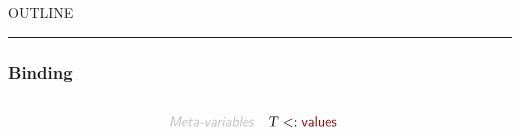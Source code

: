 


    OUTLINE
  \tableofcontents
\renewcommand{\VARHYPER}[3]{\VAR{#3}}
\renewcommand{\NAMEHYPER}[3]{\NAME{#3}}
\renewcommand{\SYNHYPER}[3]{\SYN{#3}}
\renewcommand{\SEMHYPER}[3]{\SEM{#3}}
\renewcommand{\SECTHYPER}[3]{\SECT{#3}}
\begin{center}
\rule{3in}{0.4pt}
\end{center}

\subsubsection{Binding}\hypertarget{binding}{}\label{binding}

\begin{align*}
  [ \
  \KEY{Type} \quad & \NAMEREF{environments} \\
  \KEY{Alias} \quad & \NAMEREF{envs} \\
  \KEY{Datatype} \quad & \NAMEREF{identifiers} \\
  \KEY{Alias} \quad & \NAMEREF{ids} \\
  \KEY{Funcon} \quad & \NAMEREF{identifier-tagged} \\
  \KEY{Alias} \quad & \NAMEREF{id-tagged} \\
  \KEY{Funcon} \quad & \NAMEREF{fresh-identifier} \\
  \KEY{Entity} \quad & \NAMEREF{environment} \\
  \KEY{Alias} \quad & \NAMEREF{env} \\
  \KEY{Funcon} \quad & \NAMEREF{initialise-binding} \\
  \KEY{Funcon} \quad & \NAMEREF{bind-value} \\
  \KEY{Alias} \quad & \NAMEREF{bind} \\
  \KEY{Funcon} \quad & \NAMEREF{unbind} \\
  \KEY{Funcon} \quad & \NAMEREF{bound-directly} \\
  \KEY{Funcon} \quad & \NAMEREF{bound-value} \\
  \KEY{Alias} \quad & \NAMEREF{bound} \\
  \KEY{Funcon} \quad & \NAMEREF{closed} \\
  \KEY{Funcon} \quad & \NAMEREF{scope} \\
  \KEY{Funcon} \quad & \NAMEREF{accumulate} \\
  \KEY{Funcon} \quad & \NAMEREF{collateral} \\
  \KEY{Funcon} \quad & \NAMEREF{bind-recursively} \\
  \KEY{Funcon} \quad & \NAMEREF{recursive}
  \ ]
\end{align*}
\begin{align*}
  \KEY{Meta-variables} \quad
  & \VAR{T} <: \NAMEHYPER{../../../Values}{Value-Types}{values}
\end{align*}
